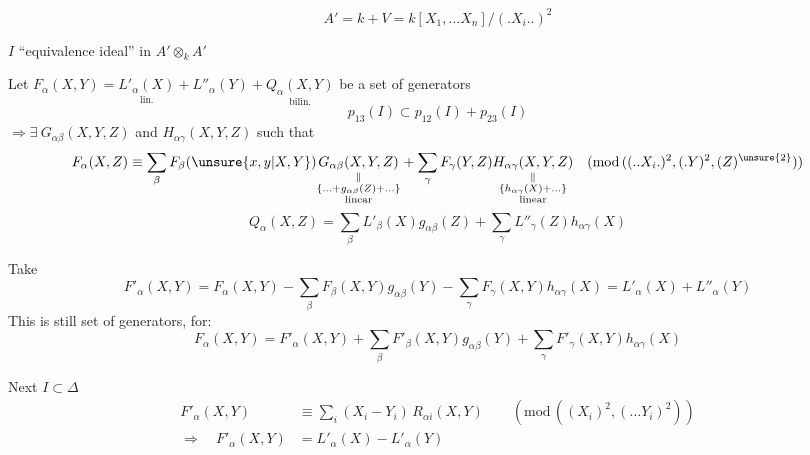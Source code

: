 \[
A'=k+V=k[X_1,\ldots X_n]/(.X_i..)^2
\]

$I$ ``equivalence ideal'' in $A'\otimes_k A'$

Let $F_\alpha(X,Y)=\underset{\text{lin.}}{L'_\alpha(X)}+L''_\alpha(Y)+\underset{\text{bilin.}}{Q_\alpha(X,Y)}$ be a set of generators
\[
p_{13}(I)\subset p_{12}(I)+p_{23}(I)
\]
$\Rightarrow\exists\ G_{\alpha\beta}(X,Y,Z)$ and $H_{\alpha\gamma}(X,Y,Z)$ such that
\[
F_\alpha(X,Z)\equiv\sum_\beta F_\beta(\unsure{x,y|X,Y})
\underset{\substack{\Vert\\\{\ldots+g_{\alpha\beta}(Z)+\ldots\}\\\text{linear}}}{G_{\alpha\beta}(X,Y,Z)}
+\sum_\gamma F_\gamma(Y,Z)
\underset{\substack{\Vert\\\{h_{\alpha\gamma}(X)+\ldots\}\\\text{linear}}}{H_{\alpha\gamma}(X,Y,Z)}
\quad(\mathrm{mod}\,((..X_i.)^2,(.Y)^2,(Z)^{\unsure{2}}))
\]
\[
Q_\alpha(X,Z)=\sum_\beta L'_\beta(X)g_{\alpha\beta}(Z)+\sum_\gamma L''_\gamma(Z)h_{\alpha\gamma}(X)
\]

Take
\[
F'_\alpha(X,Y)=F_\alpha(X,Y)-\sum_\beta F_\beta(X,Y)g_{\alpha\beta}(Y)
-\sum_\gamma F_\gamma(X,Y)h_{\alpha\gamma}(X)=L'_\alpha(X)+L''_\alpha(Y)
\]
This is still set of generators, for:
\[
F_\alpha(X,Y)=F'_\alpha(X,Y)+\sum_\beta F'_\beta(X,Y)g_{\alpha\beta}(Y)+\sum_\gamma F'_\gamma(X,Y)h_{\alpha\gamma}(X)
\]

Next $I\subset\Delta$
\[
\begin{aligned}
F'_\alpha(X,Y)&\equiv\sum_i(X_i-Y_i)\,R_{\alpha i}(X,Y)\qquad
(\mathrm{mod}\,((X_i)^2,(\ldots Y_i)^2))\\
\Rightarrow\quad F'_\alpha(X,Y)&=L'_\alpha(X)-L'_\alpha(Y)
\end{aligned}
\]

